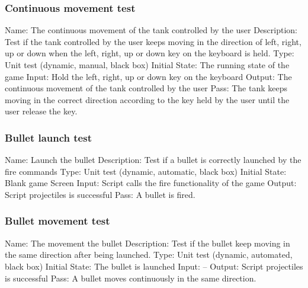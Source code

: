 \documentclass{article}
\begin{document}
\subsubsection{Continuous movement test}
Name:  The continuous movement of the tank controlled by the user\newline
Description: Test if the tank controlled by the user keeps moving in the 
direction of left, right, up or down when the left, right, up or down key on 
the keyboard is held. \newline
Type: Unit test (dynamic, manual, black box) \newline
Initial State:  The running state of the game \newline
Input: Hold the left, right, up or down key on the keyboard\newline
Output: The continuous movement of the tank controlled by the user\newline
Pass:  The tank keeps moving in the correct direction according to the key 
held by the user until the user release the key. \newline

\subsubsection{Bullet launch test}
Name:  Launch the bullet\newline
Description: Test if a bullet is correctly launched by the fire commands \newline
Type: Unit test (dynamic, automatic, black box) \newline
Initial State: Blank game Screen\newline
Input: Script calls the fire functionality of the game\newline
Output: Script projectiles is successful  \newline
Pass: A bullet is fired.\newline

\subsubsection{Bullet movement test}
Name:  The movement the bullet\newline
Description: Test if the bullet keep moving in the same direction after being 
launched. \newline
Type: Unit test (dynamic, automated, black box) \newline
Initial State:  The bullet is launched \newline
Input: --\newline
Output: Script projectiles is successful  \newline
Pass: A bullet moves continuously in the same direction.\newline
\end{document}
